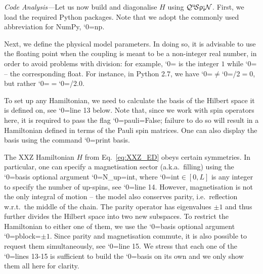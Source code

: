 \documentclass{SciPost}
\newcommand\0{\scalebox{-1}[1]{0}}
\let\svttfamily\ttfamily
\renewcommand\ttfamily{\svttfamily\catcode`0=\active }
\renewcommand\texttt{\bgroup\ttfamily\texttthelp}
\def\texttthelp#1{#1\egroup}
\newcommand{\qspin}{$\mathcal{Q}^{\mathrm{u}}\!\mathcal{S}\uprho\mathrm{\text{\textexclamdown}}\mathcal{N}$}
\begin{document}
\emph{Code Analysis---}Let us now build and diagonalise $H$ using \qspin. First, we load the required Python packages. Note that we adopt the commonly used abbreviation for NumPy, \texttt{np}. 

%
Next, we define the physical model parameters. In doing so, it is advisable to use the floating point when the coupling is meant to be a non-integer real number, in order to avoid problems with division: for example, \texttt{1} is the integer $1$ while \texttt{1.0} -- the corresponding float. For instance, in Python 2.7, we have \texttt{0.5}$\neq$\texttt{1/2$=$0}, but rather \texttt{0.5}$=$\texttt{1.0/2.0}.  

%
To set up any Hamiltonian, we need to calculate the basis of the Hilbert space it is defined on, see \texttt{line 13} below. Note that, since we work with spin operators here, it is required to pass the flag \texttt{pauli=False}; failure to do so will result in a Hamiltonian defined in terms of the Pauli spin matrices. One can also display the basis using the command \texttt{print basis}.

%
The XXZ Hamiltonian $H$ from Eq.~\eqref{eq:XXZ_ED} obeys certain symmetries. In particular, one can specify a magnetisation sector (a.k.a.~filling) using the \texttt{basis} optional argument \texttt{N\_up=int}, where \texttt{int$\in[0,L]$} is any integer to specify the number of up-spins, see \texttt{line 14}. However, magnetisation is not the only integral of motion -- the model also conserves parity, i.e.~reflection w.r.t.~the middle of the chain. The parity operator has eigenvalues $\pm1$ and thus further divides the Hilbert space into two new subspaces. To restrict the Hamiltonian to either one of them, we use the \texttt{basis} optional argument \texttt{pblock=$\pm1$}. Since parity and magnetisation commute, it is also possible to request them simultaneously, see \texttt{line 15}. We stress that each one of the \texttt{lines 13-15} is sufficient to build the \texttt{basis} on its own and we only show them all here for clarity.

% 
\end{document}
